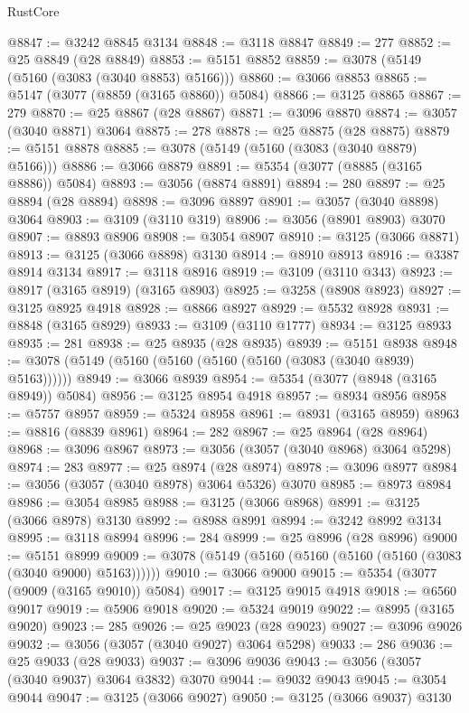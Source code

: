 \begin{lexlean}{RustCore}
\begin{coremodule}
@8847 := @3242 @8845 @3134
@8848 := @3118 @8847
@8849 := 277
@8852 := @25 @8849 (@28 @8849)
@8853 := @5151 @8852
@8859 := @3078 (@5149 (@5160 (@3083 (@3040 @8853) @5166)))
@8860 := @3066 @8853
@8865 := @5147 (@3077 (@8859 (@3165 @8860)) @5084)
@8866 := @3125 @8865
@8867 := 279
@8870 := @25 @8867 (@28 @8867)
@8871 := @3096 @8870
@8874 := @3057 (@3040 @8871) @3064
@8875 := 278
@8878 := @25 @8875 (@28 @8875)
@8879 := @5151 @8878
@8885 := @3078 (@5149 (@5160 (@3083 (@3040 @8879) @5166)))
@8886 := @3066 @8879
@8891 := @5354 (@3077 (@8885 (@3165 @8886)) @5084)
@8893 := @3056 (@8874 @8891)
@8894 := 280
@8897 := @25 @8894 (@28 @8894)
@8898 := @3096 @8897
@8901 := @3057 (@3040 @8898) @3064
@8903 := @3109 (@3110 @319)
@8906 := @3056 (@8901 @8903) @3070
@8907 := @8893 @8906
@8908 := @3054 @8907
@8910 := @3125 (@3066 @8871)
@8913 := @3125 (@3066 @8898) @3130
@8914 := @8910 @8913
@8916 := @3387 @8914 @3134
@8917 := @3118 @8916
@8919 := @3109 (@3110 @343)
@8923 := @8917 (@3165 @8919) (@3165 @8903)
@8925 := @3258 (@8908 @8923)
@8927 := @3125 @8925 @4918
@8928 := @8866 @8927
@8929 := @5532 @8928
@8931 := @8848 (@3165 @8929)
@8933 := @3109 (@3110 @1777)
@8934 := @3125 @8933
@8935 := 281
@8938 := @25 @8935 (@28 @8935)
@8939 := @5151 @8938
@8948 := @3078 (@5149 (@5160 (@5160 (@5160 (@5160 (@3083 (@3040 @8939) @5163))))))
@8949 := @3066 @8939
@8954 := @5354 (@3077 (@8948 (@3165 @8949)) @5084)
@8956 := @3125 @8954 @4918
@8957 := @8934 @8956
@8958 := @5757 @8957
@8959 := @5324 @8958
@8961 := @8931 (@3165 @8959)
@8963 := @8816 (@8839 @8961)
@8964 := 282
@8967 := @25 @8964 (@28 @8964)
@8968 := @3096 @8967
@8973 := @3056 (@3057 (@3040 @8968) @3064 @5298)
@8974 := 283
@8977 := @25 @8974 (@28 @8974)
@8978 := @3096 @8977
@8984 := @3056 (@3057 (@3040 @8978) @3064 @5326) @3070
@8985 := @8973 @8984
@8986 := @3054 @8985
@8988 := @3125 (@3066 @8968)
@8991 := @3125 (@3066 @8978) @3130
@8992 := @8988 @8991
@8994 := @3242 @8992 @3134
@8995 := @3118 @8994
@8996 := 284
@8999 := @25 @8996 (@28 @8996)
@9000 := @5151 @8999
@9009 := @3078 (@5149 (@5160 (@5160 (@5160 (@5160 (@3083 (@3040 @9000) @5163))))))
@9010 := @3066 @9000
@9015 := @5354 (@3077 (@9009 (@3165 @9010)) @5084)
@9017 := @3125 @9015 @4918
@9018 := @6560 @9017
@9019 := @5906 @9018
@9020 := @5324 @9019
@9022 := @8995 (@3165 @9020)
@9023 := 285
@9026 := @25 @9023 (@28 @9023)
@9027 := @3096 @9026
@9032 := @3056 (@3057 (@3040 @9027) @3064 @5298)
@9033 := 286
@9036 := @25 @9033 (@28 @9033)
@9037 := @3096 @9036
@9043 := @3056 (@3057 (@3040 @9037) @3064 @3832) @3070
@9044 := @9032 @9043
@9045 := @3054 @9044
@9047 := @3125 (@3066 @9027)
@9050 := @3125 (@3066 @9037) @3130

\end{coremodule}
\end{lexlean}
